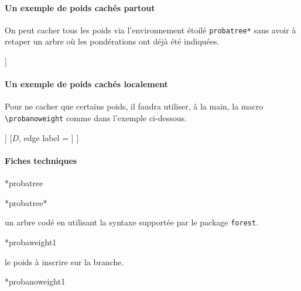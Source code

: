 \documentclass[12pt,a4paper]{article}
\makeatletter
\theoremstyle{definition}
\newcommand\IDmacro{\@ifstar{\@IDmacro@star}{\@IDmacro@no@star}}
\newcommand\@IDmacro@no@star[3]{%
    \texttt{%
    	\textbackslash#1 <macro>%
    	\IfStrEq{#2}{0}{}{%
    		\,\,[#2 Option%
				\IfStrEq{#2}{1}{}{s}]%
			}%
	    \IfStrEq{#3}{}{}{%
	    		\,\,(#3 Argument%
				\IfStrEq{#3}{1}{}{s})%
			}
	   	}
    \immediate\write\tempfile{macro,#1,#2,#3}%
}
\newcommand\@IDmacro@star[2]{%
    \@IDmacro@no@star{#1}{0}{#2}%
}
\newcommand\IDenv{\@ifstar{\@IDenv@star}{\@IDenv@no@star}}
\newcommand\@IDenv@no@star[2]{%
    \texttt{%
    	#1 <env>%
    	\IfStrEq{#2}{0}{}{%
    		\,\,[#2 Option%
				\IfStrEq{#2}{1}{}{s}]%
			}%
	   	}
    \immediate\write\tempfile{env,#1,#2}%
}
\newcommand\@IDenv@star[1]{%
    \@IDenv@no@star{#1}{0}%
}
\newcommand\@IDoptarg{\@ifstar{\@IDoptarg@star}{\@IDoptarg@no@star}}
\newcommand\@IDoptarg@star[2]{%
	\vspace{0.5em}
	\textbf{---} \texttt{#1%
		\IfStrEq{#2}{}{:}{\,#2:}%
	}%
}
\newcommand\@IDoptarg@no@star[2]{%
	\IfStrEq{#2}{}{%
		\@IDoptarg@star{#1}{}%
	}{%
		\@IDoptarg@star{#1}{#2}%
	}%
}
\newcommand\IDarg[1]{%
	\@IDoptarg{Argument}{#1}%
}
\newcommand\Content[1]{%
	\@IDoptarg{Contenu}{#1}%
}
\makeatother
\begin{document}
\paragraph{Un exemple de poids cachés partout}

On peut cacher tous les poids via l'environnement étoilé \verb+probatree*+ sans avoir à retaper un arbre où les pondérations ont déjà été indiquées.

\begin{tcblisting}{}
\begin{probatree*}
[$A$, name = left, edge label = \probaweight{$a$}
    [$B$, name = topright, edge label = \probaweight{$b$}]
    [$C$, name = bottomright, edge label = \probaweight{$c$}]
]
\end{probatree*}
\end{tcblisting}


\paragraph{Un exemple de poids cachés localement}

Pour ne cacher que certains poids, il faudra utiliser, à la main, la macro \verb+\probanoweight+ comme dans l'exemple ci-dessous.

\begin{tcblisting}{}
\begin{probatree}
[
    [$A$, name = left, edge label = \probaweight{$a$}
        [$B$, name = topright, edge label = \probanoweight{$b$}]
        [$C$, name = bottomright, edge label = \probaweight{$c$}]
    ]
    [$D$, edge label = ]
]
\end{probatree}
\end{tcblisting}


\paragraph{Fiches techniques}

\IDenv*{probatree}

\IDenv*{probatree*}

\Content{} un arbre codé en utilisant la syntaxe supportée par le package \verb+forest+.


\bigskip


\IDmacro*{probaweight}{1}

\IDarg{} le poids à inscrire sur la branche.


\bigskip


\IDmacro*{probanoweight}{1}
\end{document}
